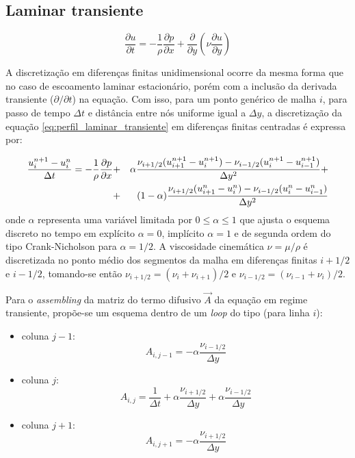 \subsection{Laminar transiente}

\begin{equation}
	\frac{\partial u}{\partial t}
	=
	- \frac{1}{\rho} \frac{\partial p}{\partial x}
	+ \frac{\partial}{\partial y}\left( \nu \frac{\partial u}{\partial y}\right)
\end{equation}

A discretização em diferenças finitas unidimensional ocorre da mesma forma
que no caso de escoamento laminar estacionário, porém com a inclusão da
derivada transiente ($\partial /\partial t$) na equação. Com isso, para
um ponto genérico de malha $i$, para passo de tempo $\Delta t$ e
distância entre nós uniforme igual a $\Delta y$, a discretização da
equação \ref{eq:perfil_laminar_transiente} em diferenças finitas
centradas é expressa por:

\begin{eqnarray}
  \frac{u_i^{n+1}-u_i^n}{\Delta t} = -\frac{1}{\rho}\frac{\partial p}{\partial x} &+&
  \alpha\frac{\nu_{i+1/2}(u_{i+1}^{n+1}-u_{i}^{n+1})
  -\nu_{i-1/2}(u_{i}^{n+1}-u_{i-1}^{n+1})}{\Delta y^2} +\nonumber\\ &+&
  (1-\alpha)\frac{\nu_{i+1/2}(u_{i+1}^n-u_{i}^n)
  -\nu_{i-1/2}(u_{i}^n-u_{i-1}^n)}{\Delta y^2}
  \label{eq:perfil_turbulento_discr}
\end{eqnarray}
onde $\alpha$ representa uma variável limitada por $0\leq\alpha\leq
1$ que ajusta o esquema discreto no tempo em explícito $\alpha=0$,
implícito $\alpha=1$ e de segunda ordem do tipo Crank-Nicholson para
$\alpha=1/2$. A viscosidade cinemática $\nu = \mu / \rho$ é
discretizada no ponto médio dos segmentos da malha em diferenças finitas
$i+1/2$ e $i-1/2$, tomando-se então $\nu_{i+1/2} =
(\nu_{i}+\nu_{i+1})/2$ e $\nu_{i-1/2} = (\nu_{i-1}+\nu_{i})/2$.

Para o \emph{assembling} da matriz do termo difusivo $\vec{A}$ da
equação em regime transiente, propõe-se um esquema dentro de um \emph{loop} do tipo (para linha $i$):

\begin{itemize}
	\item{coluna $j-1$:}
		\begin{equation}
			A_{i,j-1} = -\alpha \frac{\nu_{i-1/2}}{\Delta y}
		\end{equation}
	\item{coluna $j$:}
		\begin{equation}
			A_{i,j} = \frac{1}{\Delta t} 
			+ \alpha \frac{\nu_{i+1/2}}{\Delta y}
			+ \alpha \frac{\nu_{i-1/2}}{\Delta y}
		\end{equation}
	\item{coluna $j+1$:}
		\begin{equation}
			A_{i,j+1} = -\alpha \frac{\nu_{i+1/2}}{\Delta y}
		\end{equation}
\end{itemize}

